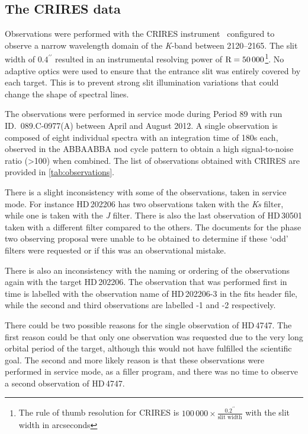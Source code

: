 
\begin{landscape}
    
\end{landscape}

\subsection{The {CRIRES} data}
\label{subsec:CRIRES}

Observations were performed with the {CRIRES} instrument~\citep{kaeufl_crires_2004} configured to observe a narrow wavelength domain of the \emph{K}-band between 2120--2165\nm{}.
The slit width of \(0.4^{\prime\prime}\) resulted in an instrumental resolving power of \(\textrm{R}=50\,000\)\footnote{The rule of thumb resolution for {CRIRES} is \(100\,000\times \frac{0.2^{\prime\prime}}{\textrm{slit width}}\) with the slit width in arcseconds}.
No adaptive optics were used to ensure that the entrance slit was entirely covered by each target.
This is to prevent strong slit illumination variations that could change the shape of spectral lines.

The observations were performed in service mode during {Period 89} with run {ID.~089.C-0977(A)} between April and August 2012.
A single observation is composed of eight individual spectra with an integration time of 180\si{\second} each, observed in the {ABBAABBA} nod cycle pattern to obtain a high signal-to-noise ratio (>100) when combined.
The list of observations obtained with {CRIRES} are provided in \cref{tab:observations}.

There is a slight inconsistency with some of the observations, taken in service mode.
For instance {HD\,202206} has two observations taken with the \emph{Ks} filter, while one is taken with the \emph{J} filter.
There is also the last observation of {HD\,30501} taken with a different filter compared to the others.
The documents for the phase two observing proposal were unable to be obtained to determine if these `odd' filters were requested or if this was an observational mistake.

There is also an inconsistency with the naming or ordering of the observations again with the target {HD\,202206}.
The observation that was performed first in time is labelled with the observation name of {HD\,202206-3} in the fits header file, while the second and third observations are labelled -1 and -2 respectively.

There could be two possible reasons for the single observation of {HD\,4747}.
The first reason could be that only one observation was requested due to the very long orbital period of the target, although this would not have fulfilled the scientific goal.
The second and more likely reason is that these observations were performed in service mode, as a filler program, and there was no time to observe a second observation of {HD\,4747}.

